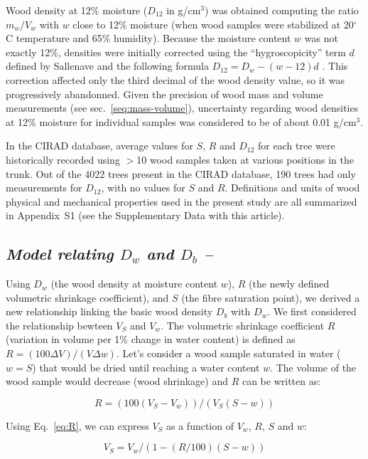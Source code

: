 \documentclass[a4paper, 12pt, leqno, dvipsnames]{article}\usepackage[]{graphicx}\usepackage[]{color}
\begin{document}
Wood density at 12\% moisture ($D_{12}$ in g/cm$^3$) was obtained computing the ratio $m_w/V_w$ with $w$ close to 12\% moisture (when wood samples were stabilized at 20$^\circ$C temperature and 65\% humidity). Because the moisture content $w$ was not exactly 12\%, densities were initially corrected using the ``hygroscopicity'' term $d$ defined by Sallenave and the following formula $D_{12}=D_w-(w-12)d$ \citep{Sallenave1971}. This correction affected only the third decimal of the wood density value, so it was progressively abandonned. Given the precision of wood mass and volume measurements (see sec.~\ref{seq:mass-volume}), uncertainty regarding wood densities at 12\% moisture for individual samples was considered to be of about 0.01 g/cm$^3$.

In the CIRAD database, average values for $S$, $R$ and $D_{12}$ for each tree were historically recorded using $>$10 wood samples taken at various positions in the trunk. Out of the 4022 trees present in the CIRAD database, 190 trees had only measurements for $D_{12}$, with no values for $S$ and $R$. Definitions and units of wood physical and mechanical properties used in the present study are all summarized in Appendix~S1 (see the Supplementary Data with this article).

\subsection*{\textit{Model relating $D_{w}$ and $D_b$ --}}

Using $D_{w}$ (the wood density at moisture content $w$), $R$ (the newly defined volumetric shrinkage coefficient), and $S$ (the fibre saturation point), we derived a new relationship linking the basic wood density $D_b$ with $D_w$. We first considered the relationship bewteen $V_S$ and $V_w$. The volumetric shrinkage coefficient $R$ (variation in volume per 1\% change in water content) is defined as $R=(100 \Delta V) / (V \Delta w)$. Let's consider a wood sample saturated in water ($w=S$) that would be dried until reaching a water content $w$. The volume of the wood sample would decrease (wood shrinkage) and $R$ can be written as: 

\begin{equation}
  R=(100(V_S-V_w))/(V_S(S-w))
  \label{eq:R}
\end{equation}

Using Eq.~\ref{eq:R}, we can express $V_S$ as a function of $V_w$, $R$, $S$ and $w$:

\begin{equation}
  V_S=V_w/(1-(R/100)(S-w))
  \label{eq:V_S}
\end{equation}
\end{document}
